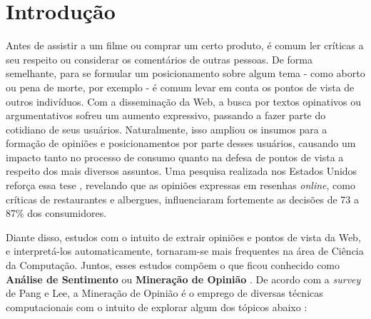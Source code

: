 \chapter{Introdução}



Antes de assistir a um filme ou comprar um certo produto, é comum ler críticas a seu respeito ou considerar os comentários de outras pessoas. De forma semelhante, para se formular um posicionamento sobre algum tema - como aborto ou pena de morte, por exemplo - é comum levar em conta os pontos de vista de outros indivíduos. Com a disseminação da Web, a busca por textos opinativos ou argumentativos sofreu um aumento expressivo, passando a fazer parte do cotidiano de seus usuários. Naturalmente, isso ampliou os insumos para a formação de opiniões e posicionamentos por parte desses usuários, causando um impacto tanto no processo de consumo quanto na defesa de pontos de vista a respeito dos mais diversos assuntos. Uma pesquisa realizada nos Estados Unidos reforça essa tese \cite{pesquisa-eua}, revelando que as opiniões expressas em resenhas \emph{online}, como críticas de restaurantes e albergues, influenciaram fortemente as decisões de 73 a 87\% dos consumidores.

Diante disso, estudos com o intuito de extrair opiniões e pontos de vista da Web, e interpretá-los automaticamente, tornaram-se mais frequentes na área de Ciência da Computação. Juntos, esses estudos compõem o que ficou conhecido como \textbf{Análise de Sentimento} ou \textbf{Mineração de Opinião} \cite{omsa,bingliu}. De acordo com a \emph{survey} de Pang e Lee, a Mineração de Opinião é o emprego de diversas técnicas computacionais com o intuito de explorar algum dos tópicos abaixo \cite{omsa}:


   



